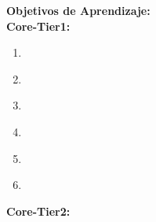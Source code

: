 \noindent \textbf{Objetivos de Aprendizaje:}\\
\noindent \textbf{Core-Tier1:}
\begin{enumerate}
	\setcounter{enumi}{0}
	\item \SPProfessionalEthicsLOIdentifyEthical\xspace[\SPProfessionalEthicsLOIdentifyEthicalLevel]\label{sec:BOK:SPProfessionalEthicsLOIdentifyEthical}
	\item \SPProfessionalEthicsLOExplainTheOfCorrectness\xspace[\SPProfessionalEthicsLOExplainTheOfCorrectnessLevel]\label{sec:BOK:SPProfessionalEthicsLOExplainTheOfCorrectness}
	\item \SPProfessionalEthicsLODescribeTheTypically\xspace[\SPProfessionalEthicsLODescribeTheTypicallyLevel]\label{sec:BOK:SPProfessionalEthicsLODescribeTheTypically}
	\item \SPProfessionalEthicsLODescribeTheWeaknesses\xspace[\SPProfessionalEthicsLODescribeTheWeaknessesLevel]\label{sec:BOK:SPProfessionalEthicsLODescribeTheWeaknesses}
	\item \SPProfessionalEthicsLOAnalyzeAIssue\xspace[\SPProfessionalEthicsLOAnalyzeAIssueLevel]\label{sec:BOK:SPProfessionalEthicsLOAnalyzeAIssue}
	\item \SPProfessionalEthicsLOEvaluateTheOf\xspace[\SPProfessionalEthicsLOEvaluateTheOfLevel]\label{sec:BOK:SPProfessionalEthicsLOEvaluateTheOf}
\end{enumerate}
\noindent \textbf{Core-Tier2:}
